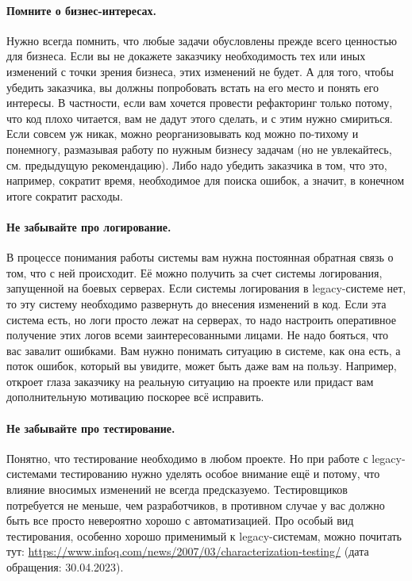 \documentclass{../../text-style}
\begin{document}
\paragraph{Помните о бизнес-интересах.} Нужно всегда помнить, что любые задачи обусловлены прежде всего ценностью для бизнеса. Если вы не докажете заказчику необходимость тех или иных изменений с точки зрения бизнеса, этих изменений не будет. А для того, чтобы убедить заказчика, вы должны попробовать встать на его место и понять его интересы. В частности, если вам хочется провести рефакторинг только потому, что код плохо читается, вам не дадут этого сделать, и с этим нужно смириться. Если совсем уж никак, можно реорганизовывать код можно по-тихому и понемногу, размазывая работу по нужным бизнесу задачам (но не увлекайтесь, см. предыдущую рекомендацию). Либо надо убедить заказчика в том, что это, например, сократит время, необходимое для поиска ошибок, а значит, в конечном итоге сократит расходы.

\paragraph{Не забывайте про логирование.} В процессе понимания работы системы вам нужна постоянная обратная связь о том, что с ней происходит. Её можно получить за счет системы логирования, запущенной на боевых серверах. Если системы логирования в legacy-системе нет, то эту систему необходимо развернуть до внесения изменений в код. Если эта система есть, но логи просто лежат на серверах, то надо настроить оперативное получение этих логов всеми заинтересованными лицами. Не надо бояться, что вас завалит ошибками. Вам нужно понимать ситуацию в системе, как она есть, а поток ошибок, который вы увидите, может быть даже вам на пользу. Например, откроет глаза заказчику на реальную ситуацию на проекте или придаст вам дополнительную мотивацию поскорее всё исправить.

\paragraph{Не забывайте про тестирование.} Понятно, что тестирование необходимо в любом проекте. Но при работе с legacy-системами тестированию нужно уделять особое внимание ещё и потому, что влияние вносимых изменений не всегда предсказуемо. Тестировщиков потребуется не меньше, чем разработчиков, в противном случае у вас должно быть все просто невероятно хорошо с автоматизацией. Про особый вид тестирования, особенно хорошо применимый к legacy-системам, можно почитать тут: \url{https://www.infoq.com/news/2007/03/characterization-testing/} (дата обращения: 30.04.2023).
\end{document}
